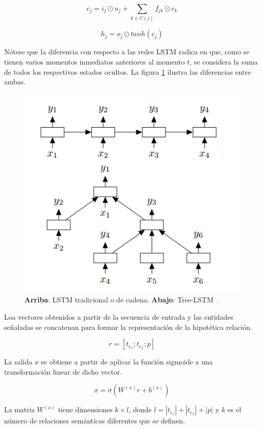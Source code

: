 \begin{equation*}
c_j = i_j \odot u_j + \sum_{k\in C(j)} f_{jk} \odot c_k
\end{equation*}

\begin{equation*}
h_j = o_j \odot tanh(c_j)
\end{equation*}

Nótese que la diferencia con respecto a las redes LSTM radica en que, como se tienen varios momentos inmediatos anteriores al momento $t$, se considera la suma de todos los respectivos estados ocultos. La figura \ref{fig:lstm_cmp} ilustra las diferencias entre ambas.

\begin{figure}[h!]
	\centering
	\includegraphics[width=0.7\linewidth]{Graphics/lstm_cmp.png}
	\caption{\textbf{Arriba}: LSTM tradicional o de cadena. \textbf{Abajo}: Tree-LSTM~\cite{tai2015improved}.}\label{fig:lstm_cmp}
\end{figure}

Loa vectores obtenidos a partir de la secuencia de entrada y las entidades señaladas se concatenan para formar la representación de la hipotética relación.

\begin{equation*}
	r = [t_{e_1}; t_{e_2}; p]
\end{equation*}

La salida $x$ se obtiene a partir de aplicar la función sigmoide a una transformación linear de dicho vector.

\begin{equation*}
	x = \sigma(W^{(x)}r + b^{(x)})
\end{equation*}

La matriz $W^{(x)}$ tiene dimensiones $k \times l$, donde $l = |t_{e_1}| + |t_{e_2}| + |p|$ y $k$ es el número de relaciones semánticas diferentes que se definen.

